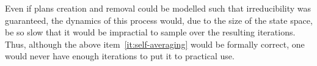 \begin{itemize}
Even if plans creation and removal could be modelled such that irreducibility was guaranteed, 
the dynamics of this process would, due to the size of the state space, be so slow that it would be 
impractial to sample over the resulting iterations. Thus, although the above item~\ref{it:self-averaging} 
would be formally correct, one would never have enough iterations to put it to practical use.

\end{itemize}


